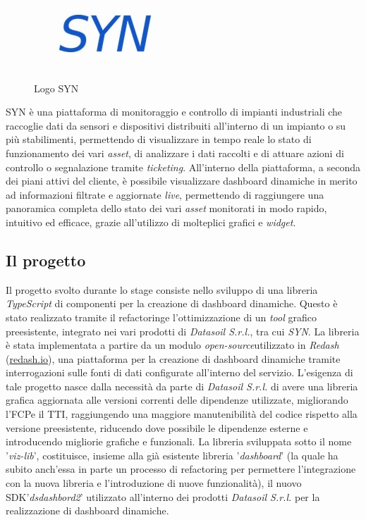 \begin{figure}[H]
      \centering
      \includegraphics[alt={Logo SYN}, width=0.25\columnwidth]{img/syn_logo.jpg}
      \caption{Logo SYN}
      \label{fig:syn}
\end{figure}

SYN è una piattaforma di monitoraggio e controllo di impianti industriali che raccoglie dati da sensori e dispositivi
distribuiti all'interno di un impianto o su più stabilimenti, permettendo di visualizzare in tempo reale lo stato di
funzionamento dei vari \textit{asset}, di analizzare i dati raccolti e di attuare azioni di controllo o segnalazione tramite
\textit{ticketing}. All'interno della piattaforma, a seconda dei piani attivi del cliente, è possibile visualizzare dashboard dinamiche
in merito ad informazioni filtrate e aggiornate \textit{live}, permettendo di raggiungere una panoramica completa dello stato dei vari
\textit{asset} monitorati in modo rapido, intuitivo ed efficace, grazie all'utilizzo di molteplici grafici e \textit{widget}.

\subsection{Il progetto}
Il progetto svolto durante lo stage consiste nello sviluppo di una libreria \textit{TypeScript} di componenti per la creazione di dashboard dinamiche.
Questo è stato realizzato tramite il \gls{refactoring}\glox e l'ottimizzazione di un \textit{tool} grafico preesistente, integrato nei vari prodotti di \textit{Datasoil S.r.l.},
tra cui \textit{SYN}. La libreria è stata implementata a partire da un modulo \textit{\gls{open-source}}\glox utilizzato in \textit{Redash} (\href{https://redash.io}{redash.io}),
una piattaforma per la creazione di dashboard dinamiche tramite interrogazioni sulle fonti di dati configurate all'interno del servizio. \newline
L'esigenza di tale progetto nasce dalla necessità da parte di \textit{Datasoil S.r.l.} di avere una libreria grafica aggiornata alle versioni
correnti delle dipendenze utilizzate, migliorando l'\gls{FCP}\glox e il \gls{TTI}\glox, raggiungendo una maggiore manutenibilità del codice rispetto alla versione
preesistente, riducendo dove possibile le dipendenze esterne e introducendo migliorie grafiche e funzionali. \newline
La libreria sviluppata sotto il nome '\textit{viz-lib}', costituisce, insieme alla già esistente libreria '\textit{dashboard}' (la quale ha subito anch'essa in parte un processo di refactoring
per permettere l'integrazione con la nuova libreria e l'introduzione di nuove funzionalità), il nuovo \gls{SDK}\glox '\textit{dsdashbord2}'
utilizzato all'interno dei prodotti \textit{Datasoil S.r.l.} per la realizzazione di dashboard dinamiche.

